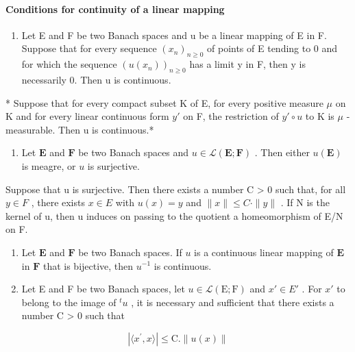 \paragraph{Conditions for continuity of a linear mapping}

\begin{enumerate}
\def\labelenumi{\arabic{enumi})}
\setcounter{enumi}{10}
\tightlist
\item
  Let E and F be two Banach spaces and u be a linear mapping of E in F. Suppose that for every sequence \((x_{n})_{n\geqslant0}\) of points of E tending to 0 and for which the sequence \((u(x_{n}))_{n\geqslant0}\) has a limit y in F, then y is necessarily 0. Then u is continuous.
\end{enumerate}

* Suppose that for every compact subset K of E, for every positive measure \(\mu\) on K and for every linear continuous form \(y'\) on F, the restriction of \(y' \circ u\) to K is \(\mu\) -measurable. Then u is continuous.*

\begin{enumerate}
\def\labelenumi{\arabic{enumi})}
\setcounter{enumi}{11}
\tightlist
\item
  Let \(\mathbf{E}\) and \(\mathbf{F}\) be two Banach spaces and \(u \in \mathcal{L}(\mathbf{E};\mathbf{F})\) . Then either \(u(\mathbf{E})\) is meagre, or \(u\) is surjective.
\end{enumerate}

Suppose that u is surjective. Then there exists a number C \textgreater{} 0 such that, for all \(y \in F\) , there exists \(x \in E\) with \(u(x) = y\) and \(\|x\| \leqslant C \cdot \|y\|\) . If N is the kernel of u, then u induces on passing to the quotient a homeomorphism of E/N on F.

\begin{enumerate}
\def\labelenumi{\arabic{enumi})}
\setcounter{enumi}{12}
\item
  Let \(\mathbf{E}\) and \(\mathbf{F}\) be two Banach spaces. If \(u\) is a continuous linear mapping of \(\mathbf{E}\) in \(\mathbf{F}\) that is bijective, then \(u^{-1}\) is continuous.
\item
  Let E and F be two Banach spaces, let \(u \in \mathcal{L}(\mathrm{E}; \mathrm{F})\) and \(x' \in E'\) . For \(x'\) to belong to the image of \(^{t}u\) , it is necessary and sufficient that there exists a number C \textgreater{} 0 such that
\end{enumerate}

\[
\left| \langle x ^ {\prime}, x \rangle \right| \leqslant \mathrm{C.} \| u (x) \|\tag{7}
\]

